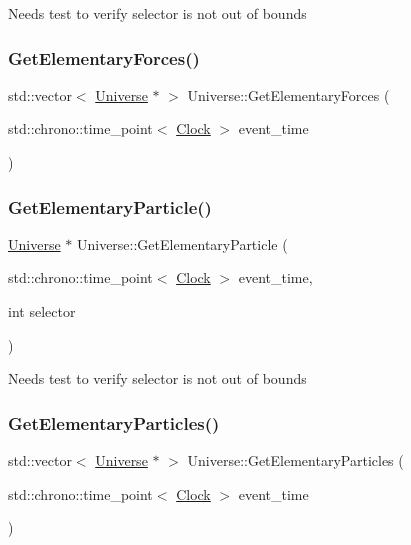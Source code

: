 Needs test to verify selector is not out of bounds\mbox{\label{classUniverse_a6a8ed579b2eedd3aceebda9f3d78aa0e}} 
\subsubsection{\texorpdfstring{Get\+Elementary\+Forces()}{GetElementaryForces()}}
{\footnotesize\ttfamily std\+::vector$<$ \mbox{\hyperlink{classUniverse}{Universe}} $\ast$ $>$ Universe\+::\+Get\+Elementary\+Forces (\begin{DoxyParamCaption}\item[{std\+::chrono\+::time\+\_\+point$<$ \mbox{\hyperlink{universe_8h_a0ef8d951d1ca5ab3cfaf7ab4c7a6fd80}{Clock}} $>$}]{event\+\_\+time }\end{DoxyParamCaption})}

\mbox{\label{classUniverse_acef54e17666d17078c522388f8f6e4f9}} 
\subsubsection{\texorpdfstring{Get\+Elementary\+Particle()}{GetElementaryParticle()}}
{\footnotesize\ttfamily \mbox{\hyperlink{classUniverse}{Universe}} $\ast$ Universe\+::\+Get\+Elementary\+Particle (\begin{DoxyParamCaption}\item[{std\+::chrono\+::time\+\_\+point$<$ \mbox{\hyperlink{universe_8h_a0ef8d951d1ca5ab3cfaf7ab4c7a6fd80}{Clock}} $>$}]{event\+\_\+time,  }\item[{int}]{selector }\end{DoxyParamCaption})}

Needs test to verify selector is not out of bounds\mbox{\label{classUniverse_a168fd9bf7602adcba1de5dd93a212775}} 
\subsubsection{\texorpdfstring{Get\+Elementary\+Particles()}{GetElementaryParticles()}}
{\footnotesize\ttfamily std\+::vector$<$ \mbox{\hyperlink{classUniverse}{Universe}} $\ast$ $>$ Universe\+::\+Get\+Elementary\+Particles (\begin{DoxyParamCaption}\item[{std\+::chrono\+::time\+\_\+point$<$ \mbox{\hyperlink{universe_8h_a0ef8d951d1ca5ab3cfaf7ab4c7a6fd80}{Clock}} $>$}]{event\+\_\+time }\end{DoxyParamCaption})}

